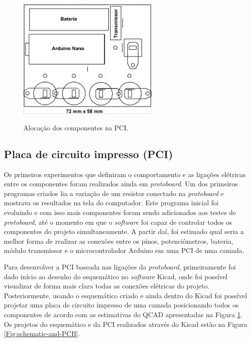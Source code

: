 \documentclass[
	12pt,				%
	openright,			%
	oneside,			%
	a4paper,			%
	english,			%
	brazil				%
	]{abntex2}
\begin{document}
		\begin{figure}[h!]
			\centering
			\caption{Alocação dos componentes na PCI.}
  		\includegraphics[width=7cm]{figures/size-glove-module1.png}
  		\label{Fig:size-glove-module1}
		\end{figure}


			\subsection{Placa de circuito impresso (PCI)}

			Os primeiros experimentos que definiram o comportamento e as ligações elétricas entre os componentes foram realizados ainda em \textit{protoboard}. Um dos primeiros programas criados lia a variação de um resistor conectado na \textit{protoboard} e mostrava os resultados na tela do computador. Este programa inicial foi evoluindo e com isso mais componentes foram sendo adicionados aos testes de \textit{protoboard}, até o momento em que o \textit{software} foi capaz de controlar todos os componentes do projeto simultaneamente. A partir daí, foi estimado  qual seria a melhor forma de realizar as conexões entre os pinos, potenciômetros, bateria, módulo transmissor e o microcontrolador Arduino em uma PCI de uma camada.

			Para desenvolver a PCI baseada nas ligações da \textit{protoboard}, primeiramente foi dado início ao desenho do esquemático no \textit{software} Kicad, onde foi possível visualizar de forma mais clara todas as conexões elétricas do projeto. Posteriormente, usando o esquemático criado e ainda dentro do Kicad foi possível projetar uma placa de circuito impresso de uma camada posicionando todos os componentes de acordo com as estimativas do QCAD apresentadas na Figura \ref{Fig:size-glove-module1}. Os projetos do esquemático e da PCI realizados através do Kicad estão na Figura \ref{Fig:schematic-and-PCB}.
\end{document}
